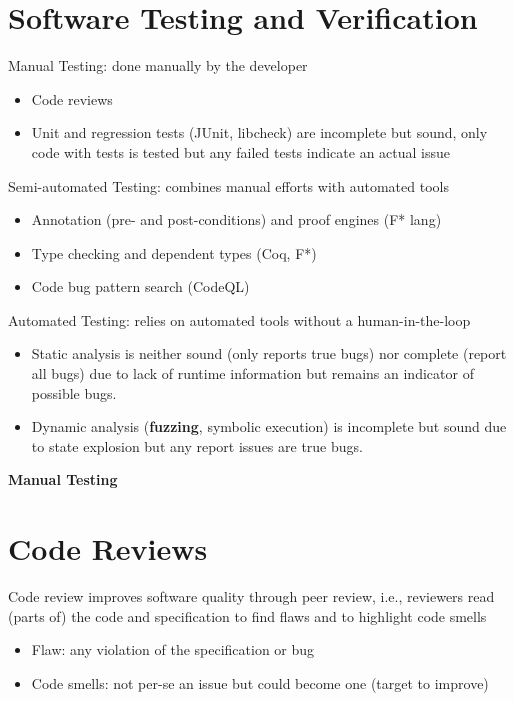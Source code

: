 \documentclass[11pt]{article}
\begin{document}
\section*{Software Testing and Verification}

Manual Testing: done manually by the developer
\begin{itemize}
	\item Code reviews
	\item Unit and regression tests (JUnit, libcheck) are incomplete but sound, only code with tests is tested but any failed tests indicate an actual issue
\end{itemize}

Semi-automated Testing: combines manual efforts with automated tools
\begin{itemize}
	\item Annotation (pre- and post-conditions) and proof engines (F* lang)
	\item Type checking and dependent types (Coq, F*)
	\item Code bug pattern search (CodeQL) 
\end{itemize}

Automated Testing: relies on automated tools without a human-in-the-loop
\begin{itemize}
	\item Static analysis is neither sound (only reports true bugs) nor complete (report all bugs) due to lack of runtime information but remains an indicator of possible bugs. 
	\item Dynamic analysis (\textbf{fuzzing}, symbolic execution) is incomplete but sound due to state explosion but any report issues are true bugs. 
\end{itemize}

\vspace{0.5cm}

\begin{center}
  {\LARGE \textbf{Manual Testing}}
\end{center}
\vspace{0.5cm}

\section*{Code Reviews}
Code review improves software quality through peer review, i.e., reviewers read (parts of) the code and specification to find flaws and to highlight code smells
\begin{itemize}
	\item Flaw: any violation of the specification or bug
	\item Code smells: not per-se an issue but could become one (target to improve)
\end{itemize}
\end{document}
